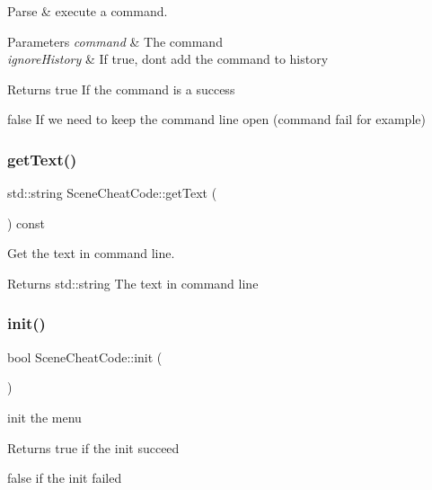Parse \& execute a command. 


\begin{DoxyParams}{Parameters}
{\em command} & The command \\
\hline
{\em ignore\+History} & If true, don\textquotesingle{}t add the command to history \\
\hline
\end{DoxyParams}
\begin{DoxyReturn}{Returns}
true If the command is a success 

false If we need to keep the command line open (command fail for example) 
\end{DoxyReturn}
\mbox{\label{class_scene_cheat_code_a486c95c6866d50d337ac3f10a0acd631}} 
\subsubsection{\texorpdfstring{get\+Text()}{getText()}}
{\footnotesize\ttfamily std\+::string Scene\+Cheat\+Code\+::get\+Text (\begin{DoxyParamCaption}{ }\end{DoxyParamCaption}) const}



Get the text in command line. 

\begin{DoxyReturn}{Returns}
std\+::string The text in command line 
\end{DoxyReturn}
\mbox{\label{class_scene_cheat_code_aa952941065350cdde0390695b32ac31d}} 
\subsubsection{\texorpdfstring{init()}{init()}}
{\footnotesize\ttfamily bool Scene\+Cheat\+Code\+::init (\begin{DoxyParamCaption}{ }\end{DoxyParamCaption})\hspace{0.3cm}{\ttfamily [virtual]}}



init the menu 

\begin{DoxyReturn}{Returns}
true if the init succeed 

false if the init failed 
\end{DoxyReturn}


